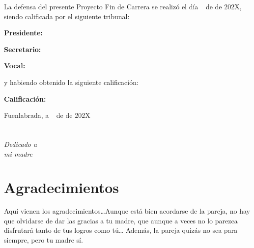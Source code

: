 \documentclass[a4paper, 12pt]{book}
\begin{document}
\vspace{1cm}
La defensa del presente Proyecto Fin de Carrera se realizó el día \qquad$\;\,$ de \qquad\qquad\qquad\qquad \newline de 202X, siendo calificada por el siguiente tribunal:


\vspace{0.5cm}
\textbf{Presidente:}

\vspace{1.2cm}
\textbf{Secretario:}

\vspace{1.2cm}
\textbf{Vocal:}


\vspace{1.2cm}
y habiendo obtenido la siguiente calificación:

\vspace{1cm}
\textbf{Calificación:}


\vspace{1cm}
\begin{flushright}
Fuenlabrada, a \qquad$\;\,$ de \qquad\qquad\qquad\qquad de 202X
\end{flushright}


\chapter*{}
\begin{flushright}
\textit{Dedicado a \\
mi madre}
\end{flushright}


\chapter*{Agradecimientos}

Aquí vienen los agradecimientos\ldots Aunque está bien acordarse de la pareja, no hay que olvidarse de dar las gracias a tu madre, que aunque a veces no lo parezca disfrutará tanto de tus logros como tú\ldots 
Además, la pareja quizás no sea para siempre, pero tu madre sí.
\end{document}
